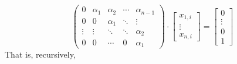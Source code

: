 \begin{example}
\[\begin{pmatrix}
		0&\alpha_1&\alpha_2&\cdots&\alpha_{n-1}\\
		0&0&\alpha_1&\ddots&\vdots\\		
		\vdots&\vdots&\ddots&\ddots&\alpha_2\\
		0&0&\cdots&0&\alpha_1
	\end{pmatrix}
	\cdot
	\begin{bmatrix}
		x_{1,i}\\
		\vdots\\
		x_{n,i}
	\end{bmatrix}
	=
	\begin{bmatrix}
		0\\
		\vdots\\
		0\\
		1
	\end{bmatrix}	
\] 
That is, recursively, 


\end{example}
